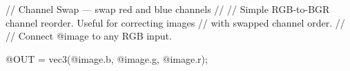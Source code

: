 // Channel Swap — swap red and blue channels
//
// Simple RGB-to-BGR channel reorder. Useful for correcting images
// with swapped channel order.
//
// Connect @image to any RGB input.

@OUT = vec3(@image.b, @image.g, @image.r);
